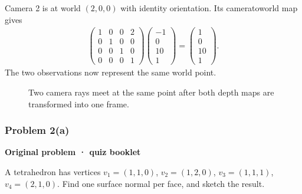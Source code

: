 \documentclass[letterpaper,11pt,english,openany,oneside]{jupyterBook}
\begin{document}
\sphinxAtStartPar
Camera 2 is at world {\color{QuizMathBlue} \((2,0,0)\)} with identity orientation. Its camera\sphinxhyphen{}to\sphinxhyphen{}world map gives
{\color{QuizMathBlue} \begin{equation*}
\begin{split}
\begin{pmatrix}1&0&0&2\\0&1&0&0\\0&0&1&0\\0&0&0&1\end{pmatrix}
\begin{pmatrix}-1\\0\\10\\1\end{pmatrix}
=\begin{pmatrix}1\\0\\10\\1\end{pmatrix}.
\end{split}
\end{equation*}}
\sphinxAtStartPar
The two observations now represent the same world point.

\par

\begin{figure}[H]
\centering
\capstart

\noindent{}
\caption{Two camera rays meet at the same point after both depth maps are transformed into one frame.}\label{\detokenize{lectures/lecture01/quiz-workbook:id2}}\end{figure}


\subsubsection{Problem 2(a)}
\label{\detokenize{lectures/lecture01/quiz-workbook:problem-2-a}}\label{\detokenize{lectures/lecture01/quiz-workbook:quiz-18-q2}}\label{\detokenize{lectures/lecture01/quiz-workbook:ex-lec01-tetrahedron}}
\par\medskip\textbf{Original problem · quiz booklet}\par\smallskip

\sphinxAtStartPar
A tetrahedron has vertices \(v_1=(1,1,0)\), \(v_2=(1,2,0)\), \(v_3=(1,1,1)\), \(v_4=(2,1,0)\). Find one  surface normal per face, and sketch the result.
\end{document}
